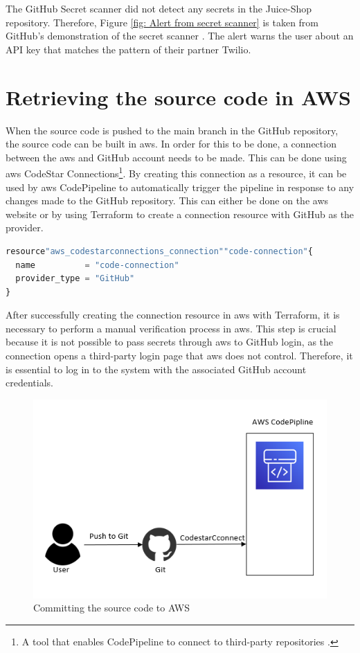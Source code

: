 The GitHub Secret scanner did not detect any secrets in the Juice-Shop repository. Therefore, Figure \ref{fig: Alert from secret scanner} is taken from GitHub's demonstration of the secret scanner \cite{GitHubVideo}. The alert warns the user about an API key that matches the pattern of their partner Twilio. 

\section{Retrieving the source code in AWS}
When the source code is pushed to the main branch in the GitHub repository, the source code can be built in \acrshort{aws}. In order for this to be done, a connection between the \acrshort{aws} and GitHub account needs to be made. This can be done using \acrshort{aws} CodeStar Connections\footnote{A tool that enables CodePipeline to connect to third-party repositories \cite{CodeStarConnections}.}. By creating this connection as a resource, it can be used by \acrshort{aws} CodePipeline to automatically trigger the pipeline in response to any changes made to the GitHub repository.
This can either be done on the \acrshort{aws} website or by using Terraform to create a connection resource with GitHub as the provider.
\\
\begin{lstlisting}[language=terraform, caption=Create a connection between AWS and GitHub, captionpos=b, frame=single]
resource"aws_codestarconnections_connection""code-connection"{
  name          = "code-connection"
  provider_type = "GitHub" 
}
\end{lstlisting}

After successfully creating the connection resource in \acrshort{aws} with Terraform, it is necessary to perform a manual verification process in \acrshort{aws}. This step is crucial because it is not possible to pass secrets through \acrshort{aws} to GitHub login, as the connection opens a third-party login page that \acrshort{aws} does not control. Therefore, it is essential to log in to the system with the associated GitHub account credentials.

\vspace{2mm}
\begin{figure}[H]
    \centering
    \includegraphics[width=0.6\columnwidth]{Images/aws-piplin-2-1.png}
    \caption{Committing the source code to AWS}
    \label{fig: Committing the source code to AWS}
\end{figure}

